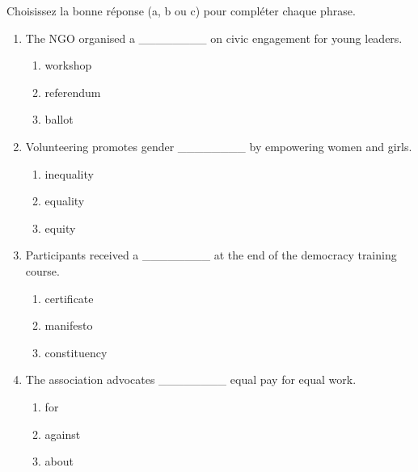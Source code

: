 \documentclass[11pt]{article}
\begin{document}
\begin{exercice}
Choisissez la bonne réponse (a, b ou c) pour compléter chaque phrase.
\begin{enumerate}
    \item The NGO organised a \_\_\_\_\_\_\_\_ on civic engagement for young leaders.
        \begin{enumerate}
            \item workshop \item referendum \item ballot
        \end{enumerate}
    \item Volunteering promotes gender \_\_\_\_\_\_\_\_ by empowering women and girls.
        \begin{enumerate}
            \item inequality \item equality \item equity
        \end{enumerate}
    \item Participants received a \_\_\_\_\_\_\_\_ at the end of the democracy training course.
        \begin{enumerate}
            \item certificate \item manifesto \item constituency
        \end{enumerate}
    \item The association advocates \_\_\_\_\_\_\_\_ equal pay for equal work.
        \begin{enumerate}
            \item for \item against \item about
        \end{enumerate}
\end{enumerate}
\end{exercice}
\end{document}
